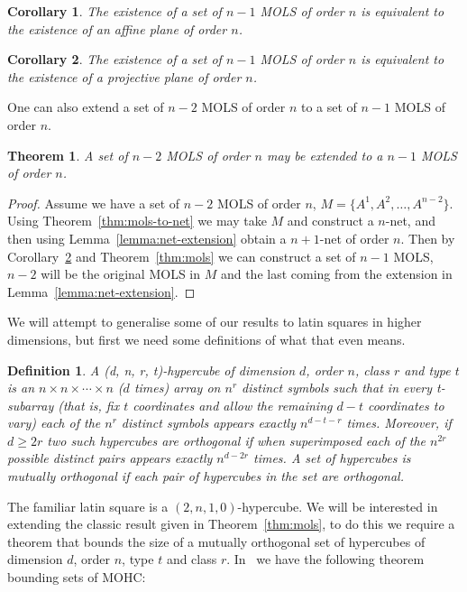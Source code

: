 \documentclass{article}
\newtheorem{theorem}{Theorem}
\newtheorem{corollary}{Corollary}
\newtheorem{definition}{Definition}
\begin{document}
\begin{corollary}
  The existence of a set of \(n - 1\) MOLS of order \(n\) is equivalent to the existence of an affine plane of order \(n\).
\end{corollary}
\begin{corollary}\label{cor:proj-MOLS}
  The existence of a set of \(n - 1\) MOLS of order \(n\) is equivalent to the existence of a projective plane of order \(n\).
\end{corollary}

One can also extend a set of \(n - 2\) MOLS of order \(n\) to a set of \(n - 1\) MOLS of order \(n\).

\begin{theorem}
  A set of \(n - 2\) MOLS of order \(n\) may be extended to a \(n - 1\) MOLS of order \(n\).
\end{theorem}

\begin{proof}
  Assume we have a set of \(n - 2\) MOLS of order \(n\), \(M = \{A^{1}, A^{2}, \ldots, A^{n - 2}\}\). Using Theorem~\ref{thm:mols-to-net} we may take \(M\) and construct a \(n\)-net, and then using Lemma~\ref{lemma:net-extension} obtain a \(n + 1\)-net of order \(n\). Then by Corollary~\ref{cor:proj-MOLS} and Theorem~\ref{thm:mols} we can construct a set of \(n - 1\) MOLS, \(n - 2\) will be the original MOLS in \(M\) and the last coming from the extension in Lemma~\ref{lemma:net-extension}.
\end{proof}


We will attempt to generalise some of our results to latin squares in higher dimensions, but first we need some definitions of what that even means.
\begin{definition}\label{def:hypercube}
  A (d, n, r, t)-hypercube of dimension \(d\), order \(n\), class \(r\) and type \(t\) is an \(n \times n \times \cdots \times n\) (\(d\) times) array on \(n^r\) distinct symbols such that in every t-subarray (that is, fix \(t\) coordinates and allow the remaining \(d - t\) coordinates to vary) each of the \(n^r\)
  distinct symbols appears exactly \(n^{d - t - r}\) times.
  Moreover, if \(d \geq 2r\) two such hypercubes are \textit{orthogonal} if when superimposed each of the \(n^{2r}\) possible distinct pairs appears exactly \(n^{d - 2r}\) times. A set of hypercubes is mutually orthogonal if each pair of hypercubes in the set are orthogonal.
\end{definition}

The familiar latin square is a \((2, n, 1, 0)\)-hypercube. We will be interested in extending the classic result given in Theorem~\ref{thm:mols}, to do this we require a
theorem that bounds the size of a mutually orthogonal set of hypercubes of dimension \(d\), order \(n\), type \(t\) and class \(r\). In~\cite{ethier2012sets} we have the following theorem bounding sets of MOHC:
\end{document}

